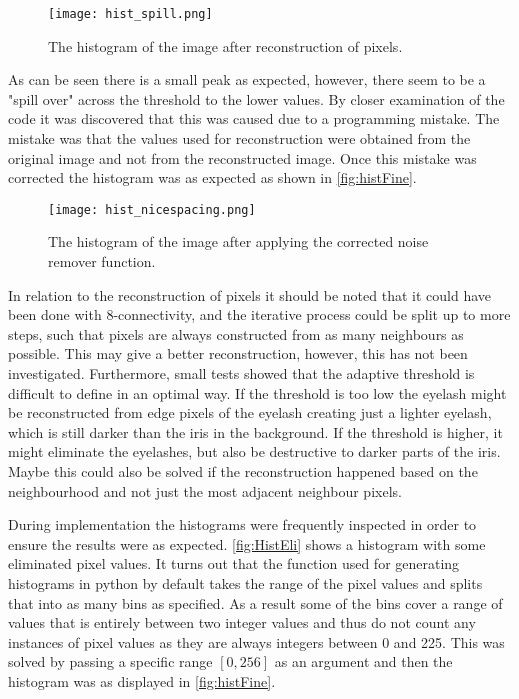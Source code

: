 \begin{figure}[H]
	\centering
	\texttt{[image: hist\_spill.png]}
	\caption{The histogram of the image after reconstruction of pixels.}
	\label{fig:histSpill}
\end{figure}

As can be seen there is a small peak as expected, however, there seem to be a "spill over" across the threshold to the lower values. By closer examination of the code it was discovered that this was caused due to a programming mistake. The mistake was that the values used for reconstruction were obtained from the original image and not from the reconstructed image. Once this mistake was corrected the histogram was as expected as shown in \autoref{fig:histFine}. 

\begin{figure}[H]
	\centering
	\texttt{[image: hist\_nicespacing.png]}
	\caption{The histogram of the image after applying the corrected noise remover function.}
	\label{fig:histFine}
\end{figure}

In relation to the reconstruction of pixels it should be noted that it could have been done with 8-connectivity, and the iterative process could be split up to more steps, such that pixels are always constructed from as many neighbours as possible. This may give a better reconstruction, however, this has not been investigated. 
Furthermore, small tests showed that the adaptive threshold is difficult to define in an optimal way. If the threshold is too low the eyelash might be reconstructed from edge pixels of the eyelash creating just a lighter eyelash, which is still darker than the iris in the background. If the threshold is higher, it might eliminate the eyelashes, but also be destructive to darker parts of the iris. Maybe this could also be solved if the reconstruction happened based on the neighbourhood and not just the most adjacent neighbour pixels.
 
During implementation the histograms were frequently inspected in order to ensure the results were as expected. \autoref{fig:HistEli} shows a histogram with some eliminated pixel values. It turns out that the function used for generating histograms in python by default takes the range of the pixel values and splits that into as many bins as specified. As a result some of the bins cover a range of values that is entirely between two integer values and thus do not count any instances of pixel values as they are always integers between 0 and 225. This was solved by passing a specific range $[0,256]$ as an argument and then the histogram was as displayed in \autoref{fig:histFine}.

